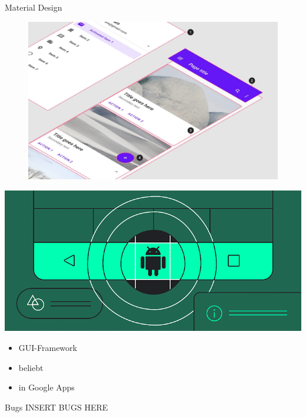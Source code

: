 \documentclass[aspectratio=169]{beamer}
\begin{document}
\begin{frame}{Material Design}
\begin{varwidth}{.5\textwidth}
        \begin{figure}
            \centering
            \includegraphics[width=\textwidth]{media/material-design-in-action.jpg}
        \end{figure}
    \end{varwidth}
    \hfill
    \begin{varwidth}{.4\textwidth}
        \includegraphics[width=\textwidth]{media/material-android.png}
        \begin{itemize}\pause
            \item GUI-Framework\pause
            \item beliebt\pause
            \item in Google Apps
        \end{itemize}
    \end{varwidth}
\end{frame}

\begin{frame}{Bugs}
INSERT BUGS HERE
\end{frame}
\end{document}
